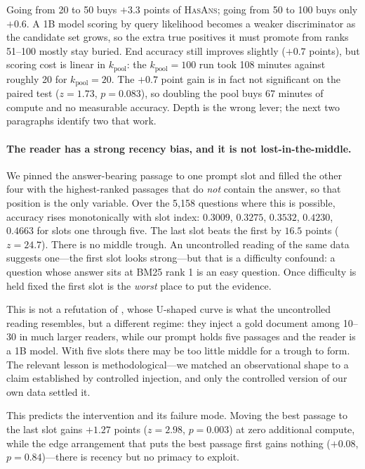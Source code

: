 \documentclass[11pt]{article}
\begin{document}
Going from 20 to 50 buys $+3.3$ points of \textsc{HasAns}; going from 50 to 100 buys only
$+0.6$. A 1B model scoring by query likelihood becomes a weaker discriminator as the candidate
set grows, so the extra true positives it must promote from ranks 51--100 mostly stay buried.
End accuracy still improves slightly ($+0.7$ points), but scoring cost is linear in
$k_{\text{pool}}$: the $k_{\text{pool}}{=}100$ run took 108 minutes against roughly 20 for
$k_{\text{pool}}{=}20$. The $+0.7$ point gain is in fact not significant on the paired test
($z{=}1.73$, $p{=}0.083$), so doubling the pool buys 67 minutes of compute and no measurable
accuracy. Depth is the wrong lever; the next two paragraphs identify two that work.

\paragraph{The reader has a strong recency bias, and it is not lost-in-the-middle.}
\label{sec:position}
We pinned the answer-bearing passage to one prompt slot and filled the other four with the
highest-ranked passages that do \emph{not} contain the answer, so that position is the only
variable. Over the 5,158 questions where this is possible, accuracy rises monotonically with
slot index: $0.3009$, $0.3275$, $0.3532$, $0.4230$, $0.4663$ for slots one through five. The
last slot beats the first by $16.5$ points ($z{=}24.7$). There is no middle trough. An
uncontrolled reading of the same data suggests one---the first slot looks strong---but that is
a difficulty confound: a question whose answer sits at BM25 rank 1 is an easy question. Once
difficulty is held fixed the first slot is the \emph{worst} place to put the evidence.

This is not a refutation of \citet{liu2024lost}, whose U-shaped curve is what the
uncontrolled reading resembles, but a different regime: they inject a gold document among
10--30 in much larger readers, while our prompt holds five passages and the reader is a 1B
model. With five slots there may be too little middle for a trough to form. The relevant
lesson is methodological---we matched an observational shape to a claim established by
controlled injection, and only the controlled version of our own data settled it.

This predicts the intervention and its failure mode. Moving the best passage to the last slot
gains $+1.27$ points ($z{=}2.98$, $p{=}0.003$) at zero additional compute, while the
edge arrangement that puts the best passage first gains nothing ($+0.08$, $p{=}0.84$)---there
is recency but no primacy to exploit.
\end{document}
